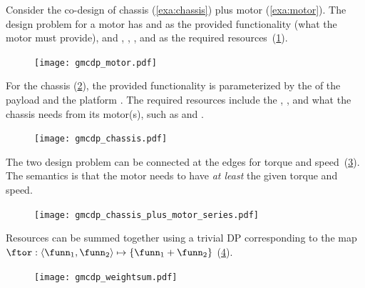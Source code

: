 \begin{example}
\label{exa:chassis_plus_motor}Consider the co-design of chassis (\cref{exa:chassis})
plus motor (\cref{exa:motor}). The design problem for a motor has 
and  as the provided functionality (what the motor must
provide), and , , , and 
as the required resources~(\cref{fig:motor}).

\begin{figure}[h]
    \centering
    \texttt{[image: gmcdp\_motor.pdf]}
    \label{fig:motor}
\end{figure}


\noindent For the chassis (\cref{fig:gmcdp_chassis}), the provided
functionality is parameterized by the  of the payload and
the platform . The required resources include the ,
, and what the chassis needs from its motor(s), such
as  and .

\begin{figure}[h]
    \centering
    \texttt{[image: gmcdp\_chassis.pdf]}
    \caption{\label{fig:gmcdp_chassis}}
\end{figure}


\noindent The two design problem can be connected at the edges for
torque and speed~(\cref{fig:gmcdp_chassis_plus_motor_series}). The
semantics is that the motor needs to have\emph{ at least }the given
torque and speed. 

\begin{figure}[h]
    \centering
    \texttt{[image: gmcdp\_chassis\_plus\_motor\_series.pdf]}
    \caption{\label{fig:gmcdp_chassis_plus_motor_series}}
\end{figure}


\noindent Resources can be summed together using a trivial DP corresponding
to the map $\ftor:\left\langle \funn_{1},\funn_{2}\right\rangle \mapsto\{\funn_{1}+\funn_{2}\}$
(\cref{fig:total_cost}).

\begin{figure}[h]
    \centering
    \texttt{[image: gmcdp\_weightsum.pdf]}
    \caption{\label{fig:total_cost}}
\end{figure}


\end{example}
